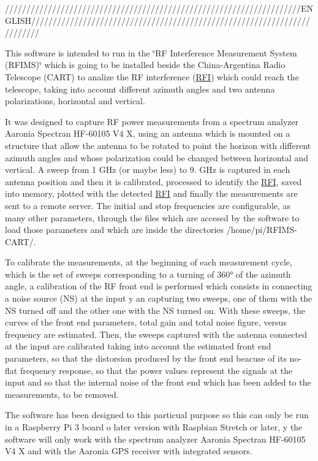 /////////////////////////////////////////////////////////////////////\+E\+N\+G\+L\+I\+S\+H/////////////////////////////////////////////////////////////////////////

This software is intended to run in the \char`\"{}\+R\+F Interference Measurement System (\+R\+F\+I\+M\+S)\char`\"{} which is going to be installed beside the China-\/\+Argentina Radio Telescope (C\+A\+RT) to analize the RF interference (\hyperlink{structRFI}{R\+FI}) which could reach the telescope, taking into account different azimuth angles and two antenna polarizations, horizontal and vertical.

It was designed to capture RF power measurements from a spectrum analyzer Aaronia Spectran H\+F-\/60105 V4 X, using an antenna which is mounted on a structure that allow the antenna to be rotated to point the horizon with different azimuth angles and whose polarization could be changed between horizontal and vertical. A sweep from 1 G\+Hz (or maybe less) to 9. G\+Hz is captured in each antenna position and then it is calibrated, processed to identify the \hyperlink{structRFI}{R\+FI}, saved into memory, plotted with the detected \hyperlink{structRFI}{R\+FI} and finally the measurements are sent to a remote server. The initial and stop frequencies are configurable, as many other parameters, through the files which are accesed by the software to load those parameters and which are inside the directories /home/pi/\+R\+F\+I\+M\+S-\/\+C\+A\+R\+T/.

To calibrate the measurements, at the beginning of each measurement cycle, which is the set of sweeps corresponding to a turning of 360° of the azimuth angle, a calibration of the RF front end is performed which consists in connecting a noise source (NS) at the input y an capturing two sweeps, one of them with the NS turned off and the other one with the NS turned on. With these sweeps, the curves of the front end parameters, total gain and total noise figure, versus frequency are estimated. Then, the sweeps captured with the antenna connected at the input are calibrated taking into account the estimated front end parameters, so that the distorsion produced by the front end beacuse of its no-\/flat frequency response, so that the power values represent the signals at the input and so that the internal noise of the front end which has been added to the measurements, to be removed.

The software has been designed to this particual purpose so this can only be run in a Raspberry Pi 3 board o later version with Raspbian Stretch or later, y the software will only work with the spectrum analyzer Aaronia Spectran H\+F-\/60105 V4 X and with the Aaronia G\+PS receiver with integrated sensors.

